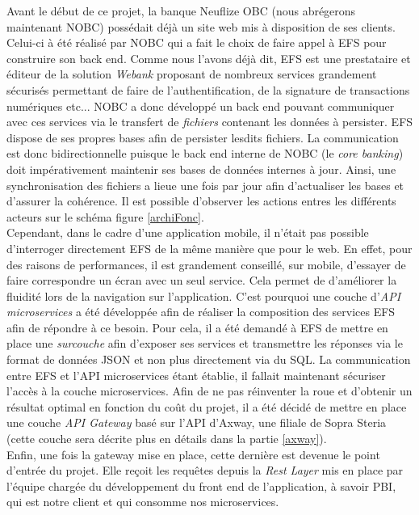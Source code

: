 	Avant le début de ce projet, la banque Neuflize OBC (nous abrégerons maintenant NOBC) possédait déjà un site web mis à disposition de ses clients. Celui-ci à été réalisé par NOBC qui a fait le choix de faire appel à EFS pour construire son back end. Comme nous l'avons déjà dit, EFS est une prestataire et éditeur de la solution \textit{Webank} proposant de nombreux services grandement sécurisés permettant de faire de l'authentification, de la signature de transactions numériques etc... NOBC a donc développé un back end pouvant communiquer avec ces services via le transfert de \textit{fichiers} contenant les données à persister. EFS dispose de ses propres bases afin de persister lesdits fichiers. La communication est donc bidirectionnelle puisque le back end interne de NOBC (le \textit{core banking}) doit impérativement maintenir ses bases de données internes à jour. Ainsi, une synchronisation des fichiers a lieue une fois par jour afin d'actualiser les bases et d'assurer la cohérence. Il est possible d'observer les actions entres les différents acteurs sur le schéma figure \ref{archiFonc}. \\
	
	Cependant, dans le cadre d'une application mobile, il n'était pas possible d'interroger directement EFS de la même manière que pour le web. En effet, pour des raisons de performances, il est grandement conseillé, sur mobile, d'essayer de faire correspondre un écran avec un seul service. Cela permet de d'améliorer la fluidité lors de la navigation sur l'application. C'est pourquoi une couche d'\textit{API microservices} a été développée afin de réaliser la composition des services EFS afin de répondre à ce besoin. Pour cela, il a été demandé à EFS de mettre en place une \textit{surcouche} afin d'exposer ses services et transmettre les réponses via le format de données JSON et non plus directement via du SQL. La communication entre EFS et l'API microservices étant établie, il fallait maintenant sécuriser l'accès à la couche microservices. Afin de ne pas réinventer la roue et d'obtenir un résultat optimal en fonction du coût du projet, il a été décidé de mettre en place une couche \textit{API Gateway} basé sur l'API d'Axway, une filiale de Sopra Steria (cette couche sera décrite plus en détails dans la partie \ref{axway}). \\
	
	Enfin, une fois la gateway mise en place, cette dernière est devenue le point d'entrée du projet. Elle reçoit les requêtes depuis la \textit{Rest Layer} mis en place par l'équipe chargée du développement du front end de l'application, à savoir PBI, qui est notre client et qui consomme nos microservices. \\

